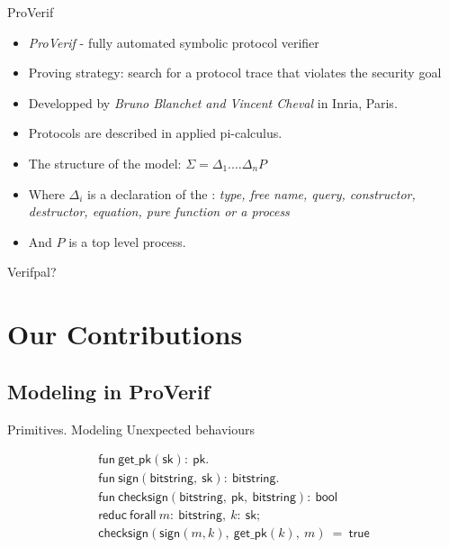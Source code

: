 \documentclass{beamer}
\begin{document}

\begin{frame}{ProVerif}
\begin{itemize}
    \item \textit{ProVerif} - fully automated symbolic protocol verifier
    \item Proving strategy: search for a protocol trace that violates the security goal
    \item Developped by \textit{Bruno Blanchet and Vincent Cheval} in Inria, Paris.
    \item Protocols are described in applied pi-calculus.
    \item The structure of the model: $\Sigma = \Delta_1. \ldots \Delta_n P$
    \item Where $\Delta_i$ is a declaration of the : \textit{type, free name, query, constructor, destructor, equation, pure function or a process}
    \item And $P$ is a top level process.
\end{itemize}
\end{frame}


\begin{frame}{Verifpal?}


\end{frame}


\section{Our Contributions}

\subsection{Modeling in ProVerif}


\begin{frame}{Primitives. Modeling Unexpected behaviours}
  \begin{fleqn}[\parindent]
    \begin{equation*}\begin{array}{l}
        \mathsf{fun}\ \mathsf{get\_pk}(\mathsf{sk}):\ \mathsf{pk}. \\
        \mathsf{fun}\ \mathsf{sign}(\mathsf{bitstring},\ \mathsf{sk}):\ \mathsf{bitstring}. \\
        \mathsf{fun}\ \mathsf{checksign}(\mathsf{bitstring},\ \mathsf{pk},\ \mathsf{bitstring}):\ \mathsf{bool} \\
        \mathsf{reduc}\ \mathsf{forall}\ m:\ \mathsf{bitstring},\ k:\ \mathsf{sk}; \\
        \mathsf{checksign}(\mathsf{sign}(m,k),\ \mathsf{get\_pk}(k),\ m)\ =\ \mathsf{true} \\
    \end{array}\end{equation*}
  \end{fleqn}
\end{frame}
\end{document}
